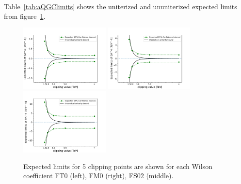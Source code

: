 Table~\ref{tab:aQGClimits} shows the uniterized and ununiterized expected limits from figure~\ref{fig:aQGClimits}.
\begin{figure}[ht]
    \centering
    \includegraphics[width=0.40\textwidth]{figures/aQGC/ClippedFT0CI.pdf}
    	\includegraphics[width=0.40\textwidth]{figures/aQGC/ClippedFM0CI.pdf}
    	\includegraphics[width=0.40\textwidth]{figures/aQGC/ClippedFS02CI.pdf}
        \caption{Expected limits for 5 clipping points are shown for each Wilson coefficient FT0 (left), FM0 (right), FS02 (middle).}
        \label{fig:aQGClimits}
\end{figure}



